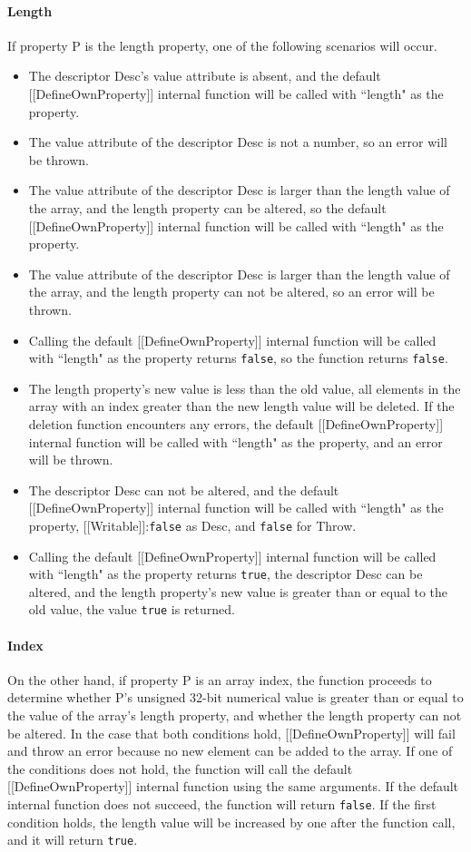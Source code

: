 \documentclass[a4paper,11pt,twoside]{report}
\begin{document}
\paragraph{Length}
If property P is the length property, one of the following scenarios will occur.
\begin{itemize}
\item The descriptor Desc's value attribute is absent, and the default [[DefineOwnProperty]] internal function will be called with ``length" as the property.
\item The value attribute of the descriptor Desc is not a number, so an error will be thrown.
\item The value attribute of the descriptor Desc is larger than the length value of the array, and the length property can be altered, so the default [[DefineOwnProperty]] internal function will be called with ``length" as the property.
\item The value attribute of the descriptor Desc is larger than the length value of the array, and the length property can not be altered, so an error will be thrown.
\item Calling the default [[DefineOwnProperty]] internal function will be called with ``length" as the property returns \texttt{false}, so the function returns \texttt{false}.
\item The length property's new value is less than the old value, all elements in the array with an index greater than the new length value will be deleted. If the deletion function encounters any errors, the default [[DefineOwnProperty]] internal function will be called with ``length" as the property, and an error will be thrown.
\item The descriptor Desc can not be altered, and the default [[DefineOwnProperty]] internal function will be called with ``length" as the property, [[Writable]]:\texttt{false} as Desc, and \texttt{false} for Throw.
\item Calling the default [[DefineOwnProperty]] internal function will be called with ``length" as the property returns \texttt{true}, the descriptor Desc can be altered, and the length property's new value is greater than or equal to the old value, the value \texttt{true} is returned.
\end{itemize}

\paragraph{Index}
On the other hand, if property P is an array index, the function proceeds to determine whether P's unsigned 32-bit numerical value is greater than or equal to the value of the array's length property, and whether the length property can not be altered. In the case that both conditions hold, [[DefineOwnProperty]] will fail and throw an error because no new element can be added to the array. If one of the conditions does not hold, the function will call the default [[DefineOwnProperty]] internal function using the same arguments. If the default internal function does not succeed, the function will return \texttt{false}. If the first condition holds, the length value will be increased by one after the function call, and it will return \texttt{true}.
\end{document}
